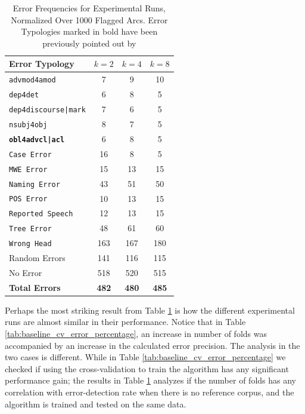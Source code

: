\begin{table}[H]
    \centering
    \begin{tabular}{|l|c|c|c|}
        \hline
        \textbf{Error Typology} & \textbf{$k = 2$} & \textbf{$k= 4$} & \textbf{$k=8$} \\
        \hline
        \texttt{advmod4amod} & 7 & 9 & 10\\
        \texttt{dep4det} & 6 & 8 & 5\\
        \texttt{dep4discourse|mark} & 7 & 6 & 5\\
        \texttt{nsubj4obj} & 8 & 7 & 5\\
        \textbf{\texttt{obl4advcl|acl}} & 6 & 8 & 5\\
        \texttt{Case Error} & 16 & 8 & 5\\
        \texttt{MWE Error} & 15 & 13 & 15\\
        \texttt{Naming Error} & 43 & 51 & 50\\
        \texttt{POS Error} & 10 & 13 & 15\\
        \texttt{Reported Speech} & 12 & 13 & 15\\
        \texttt{Tree Error} & 48 & 61 & 60\\
        \texttt{Wrong Head} & 163 & 167 & 180\\
        Random Errors & 141 & 116 & 115\\
        No Error & 518 & 520 & 515\\
        \hline
        \textbf{Total Errors} & \textbf{482} & \textbf{480} & \textbf{485}\\
\hline
    \end{tabular}
    \caption[Error Frequencies for Experimental Runs, Normalized Over 1000 Flagged Arcs]{Error Frequencies for Experimental Runs, Normalized Over 1000 Flagged Arcs. Error Typologies marked in bold have been previously pointed out by \cite{alzetta2017dangerous}}
    \label{tab:normalized_experimental_lisca}
\end{table}

Perhaps the most striking result from Table \ref{tab:normalized_experimental_lisca} is how the different experimental runs are almost similar in their performance. Notice that in Table \ref{tab:baseline_cv_error_percentage}, an increase in number of folds was accompanied by an increase in the calculated error precision. The analysis in the two cases is different. While in Table \ref{tab:baseline_cv_error_percentage} we checked if using the cross-validation to train the algorithm has any significant performance gain; the results in Table \ref{tab:normalized_experimental_lisca} analyzes if the number of folds has any correlation with error-detection rate when there is no reference corpus, and the algorithm is trained and tested on the same data. 

